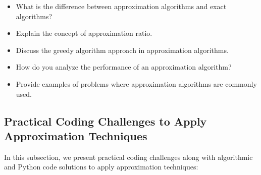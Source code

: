 \documentclass[12pt]{book} %
\begin{document}
\begin{itemize}
    \item What is the difference between approximation algorithms and exact algorithms?
    \item Explain the concept of approximation ratio.
    \item Discuss the greedy algorithm approach in approximation algorithms.
    \item How do you analyze the performance of an approximation algorithm?
    \item Provide examples of problems where approximation algorithms are commonly used.
\end{itemize}

\subsection{Practical Coding Challenges to Apply Approximation Techniques}
In this subsection, we present practical coding challenges along with algorithmic and Python code solutions to apply approximation techniques:
\end{document}
